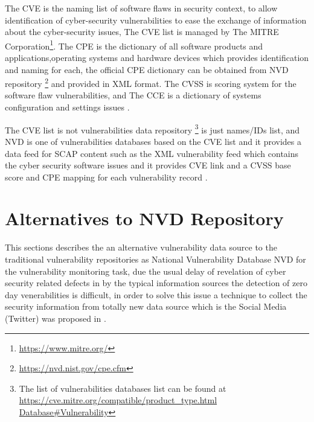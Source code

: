 \documentclass{llncs}
\begin{document}
 \par  
The CVE is the naming list of software flaws in security context, to allow identification of cyber-security vulnerabilities to ease the exchange of information about the cyber-security issues, The CVE list is managed by The MITRE Corporation\footnote{\url{https://www.mitre.org/}}. The CPE is the dictionary of all software products and applications,operating systems and hardware devices which provides identification and naming for each, the official CPE dictionary can be obtained from NVD repository \footnote{\url{https://nvd.nist.gov/cpe.cfm}} and provided in XML format. The CVSS is scoring system for the software flaw vulnerabilities, and The CCE is  a dictionary of systems configuration and settings issues \cite{scap_doc}.
\par
The CVE list is not vulnerabilities data repository \footnote{The list of vulnerabilities databases list can be found at  \url{https://cve.mitre.org/compatible/product_type.html Database\#Vulnerability}} is just names/IDs list, 
and NVD is one of vulnerabilities databases based on the CVE list and it provides a data feed for SCAP content such as  the XML vulnerability feed which contains the cyber security software issues and it provides CVE link and  a CVSS base score and CPE mapping for each vulnerability record \cite{nvd}.    


\section{Alternatives to NVD Repository}

\par This sections describes the an alternative vulnerability data source to the traditional vulnerability repositories as National Vulnerability Database NVD for the vulnerability monitoring task, due the usual delay of revelation of cyber security related defects in by the typical information sources the detection of zero day venerabilities is difficult, in order to solve this issue a technique to collect the security information from totally new data source which is the Social Media (Twitter) was proposed in \cite{paper2}.
\par
\end{document}
